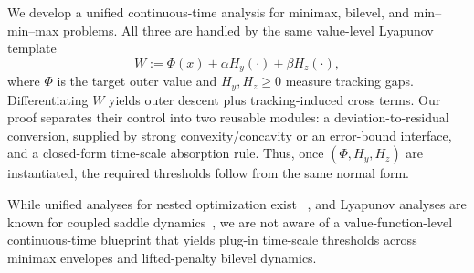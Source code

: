 \documentclass{article}
\newcommand{\1}{\mathbf{1}}
\begin{document}
\begin{table}
\centering
\small
\setlength{\tabcolsep}{3.5pt}
\caption{Instantiation of the unified Lyapunov blueprint. Here $F=\max_y f(x,y)$, $f=f(x,y)$, $g=g(x,z)$, and $f^*,g^*$ denote inner optima.}
\label{tab:instantiation}
\end{table}
We develop a unified continuous-time analysis for minimax, bilevel, and min--min--max problems. All three are handled by the same value-level Lyapunov template
\[
W:=\Phi(x)+\alpha H_y(\cdot)+\beta H_z(\cdot),
\]
where $\Phi$ is the target outer value and $H_y,H_z\ge 0$ measure tracking gaps.
Differentiating $W$ yields outer descent plus tracking-induced cross terms. Our
proof separates their control into two reusable modules: a deviation-to-residual
conversion, supplied by strong convexity/concavity or an error-bound interface,
and a closed-form time-scale absorption rule. Thus, once
$(\Phi,H_y,H_z)$ are instantiated, the required thresholds follow from the same normal form.

While unified analyses for nested optimization exist
~\cite{chen2021alset,tarzanagh2022fednest}, and Lyapunov analyses are known for coupled saddle dynamics~\cite{feijer2010pd,cherukuri2017saddle}, we are not aware of a value-function-level continuous-time blueprint that yields plug-in time-scale thresholds across minimax envelopes and lifted-penalty bilevel dynamics.
\end{document}
